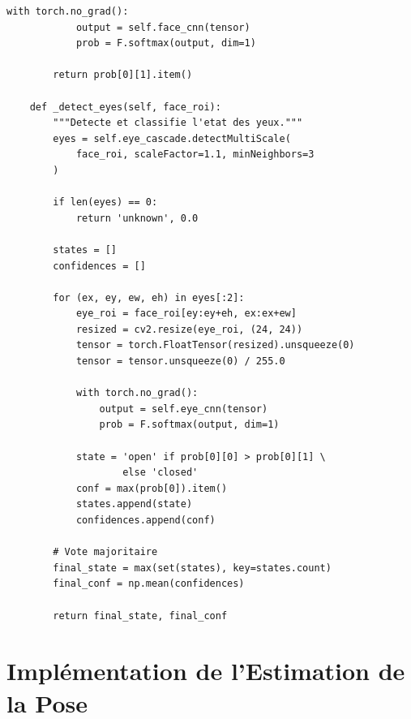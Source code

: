 \documentclass[12pt,a4paper,twoside]{report}
\begin{document}
\begin{lstlisting}[style=pythonstyle, caption={Module de détection visage et yeux.}, label={lst:face_detection}]
        with torch.no_grad():
            output = self.face_cnn(tensor)
            prob = F.softmax(output, dim=1)
        
        return prob[0][1].item()
    
    def _detect_eyes(self, face_roi):
        """Detecte et classifie l'etat des yeux."""
        eyes = self.eye_cascade.detectMultiScale(
            face_roi, scaleFactor=1.1, minNeighbors=3
        )
        
        if len(eyes) == 0:
            return 'unknown', 0.0
        
        states = []
        confidences = []
        
        for (ex, ey, ew, eh) in eyes[:2]:
            eye_roi = face_roi[ey:ey+eh, ex:ex+ew]
            resized = cv2.resize(eye_roi, (24, 24))
            tensor = torch.FloatTensor(resized).unsqueeze(0)
            tensor = tensor.unsqueeze(0) / 255.0
            
            with torch.no_grad():
                output = self.eye_cnn(tensor)
                prob = F.softmax(output, dim=1)
            
            state = 'open' if prob[0][0] > prob[0][1] \
                    else 'closed'
            conf = max(prob[0]).item()
            states.append(state)
            confidences.append(conf)
        
        # Vote majoritaire
        final_state = max(set(states), key=states.count)
        final_conf = np.mean(confidences)
        
        return final_state, final_conf
\end{lstlisting}

\section{Implémentation de l'Estimation de la Pose}
\end{document}
